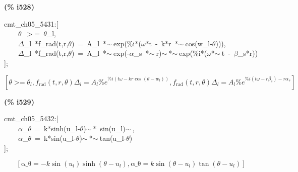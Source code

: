 \documentclass[fleqn]{article}
\begin{document}
\noindent
\begin{minipage}[t]{4.000000em}\color{red}\bfseries
(\% i528)	
\end{minipage}
\begin{minipage}[t]{\textwidth}\color{blue}
cmt\_ch05\_5431:[\\
\ \ \ \ \ensuremath{\theta}\ \ensuremath{>}=\ \ensuremath{\theta}\_l,\\
\ \ \ \ \ensuremath{\Delta}\_l\ *f\_rad(t,r,\ensuremath{\theta})\ =\ A\_l\ *\ensuremath{\sim\ }exp(\%i*(\ensuremath{\omega}*t\ -\ k*r\ *\ensuremath{\sim\ }cos(w\_l-\ensuremath{\theta}))),\\
\ \ \ \ \ensuremath{\Delta}\_l\ *f\_rad(t,r,\ensuremath{\theta})\ =\ A\_l\ *\ensuremath{\sim\ }exp(-\ensuremath{\alpha}\_s\ *\ensuremath{\sim\ }r)\ensuremath{\sim\ }*\ensuremath{\sim\ }exp(\%i*(\ensuremath{\omega}*\ensuremath{\sim\ }t\ -\ \ensuremath{\beta}\_s*r))\\
];
\end{minipage}
\[\displaystyle \tag{\% o528} 
\operatorname{[}\theta \operatorname{>  =}{{\theta }_l}\operatorname{,}{f_{\ensuremath{\mathrm{rad}}}}\left( t\operatorname{,}r\operatorname{,}\theta \right)  {{\Delta }_l}={A_l} {{\% e}^{\% i \left( t \omega -k r \cos{\left( \theta -{w_l}\right) }\right) }}\operatorname{,}{f_{\ensuremath{\mathrm{rad}}}}\left( t\operatorname{,}r\operatorname{,}\theta \right)  {{\Delta }_l}={A_l}{{\% e}^{\% i \left( t \omega -r {{\beta }_s}\right) -r {{\alpha }_s}}}\operatorname{]}\mbox{}
\]


\noindent
\begin{minipage}[t]{4.000000em}\color{red}\bfseries
(\% i529)	
\end{minipage}
\begin{minipage}[t]{\textwidth}\color{blue}
cmt\_ch05\_5432:[\\
\ \ \ \ \ensuremath{\alpha}\_\ensuremath{\theta}\ =\ k*sinh(u\_l-\ensuremath{\theta})\ensuremath{\sim\ }*\ sin(u\_l)\ensuremath{\sim\ },\ \\
\ \ \ \ \ensuremath{\alpha}\_\ensuremath{\theta}\ =\ k*sin(u\_l-\ensuremath{\theta})\ensuremath{\sim\ }*\ensuremath{\sim\ }tan(u\_l-\ensuremath{\theta})\\
];
\end{minipage}
\[\displaystyle \tag{\% o529} 
\left[ \ensuremath{\mathrm{\alpha \_ \theta }}=-k \sin{\left( {u_l}\right) } \sinh{\left( \theta -{u_l}\right) }\operatorname{,}\ensuremath{\mathrm{\alpha \_ \theta }}=k \sin{\left( \theta -{u_l}\right) } \tan{\left( \theta -{u_l}\right) }\right] \mbox{}
\]
\end{document}
